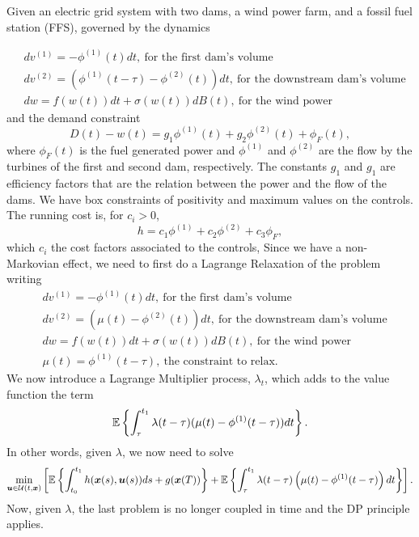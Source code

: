 \begin{example} \label{ex:quadr_prob}

Given an electric grid system with two dams, a wind power farm, and a fossil fuel 
station (FFS), governed by the dynamics

\begin{equation} \label{eq:dyn_coupled_dams}
\begin{aligned}
&dv^{(1)} = -\phi^{(1)}(t) dt,\ \text{for the first dam's volume} \\
&dv^{(2)}=(\phi^{(1)}(t-\tau)-\phi^{(2)}(t)) dt,\ \text{for the downstream dam's volume} \\
&dw =f(w(t)) dt + \sigma(w(t)) dB(t),\ \text{for the wind power}
\end{aligned}
\end{equation}
and the demand constraint
\[
D(t) -w(t) = g_1\phi^{(1)}(t) + g_2\phi^{(2)}(t) + \phi_F(t),
\]
where $\phi_F(t)$ is the fuel generated power and $\phi^{(1)}$ and $\phi^{(2)}$ are the flow by the turbines of the first and second dam, respectively. The constants $g_1$ and $g_1$ are efficiency factors that are the relation between the power and the flow of the dams. We have box constraints of positivity and maximum values on the controls.
The running cost is, for $c_i>0$,
\[
h = c_1 \phi^{(1)} + c_2 \phi^{(2)} + c_3 \phi_F,
\]
which $c_i$ the cost factors associated to the controls, Since we have a non-Markovian effect, we need to first do a Lagrange Relaxation
 of the problem writing
\begin{equation}
\begin{aligned}
&dv^{(1)} = -\phi^{(1)}(t) dt,\ \text{for the first dam's volume} \\
&dv^{(2)} = (\mu(t)-\phi^{(2)}(t)) dt,\ \text{for  the downstream dam's volume} \\
&dw =f(w(t)) dt + \sigma(w(t)) dB(t),\ \text{for the wind power}\\
&\mu(t) =\phi^{(1)}(t-\tau),\ \text{the constraint to relax}.
\end{aligned}
\end{equation}
We now introduce a Lagrange Multiplier process, $\lambda_t$, which adds 
to the value function the term
\[
\mathbb{E}\left\{\int_\tau^{t_1} \lambda(t-\tau) (\mu(t) -\phi^{(1)}(t-\tau)) dt\right\}.
\]
In other words,  given $\lambda$, we now need to solve
\[
\min_{\bm{u} \in \mathcal{U}(t,\bm{x})}\left[ \mathbb{E}\left\{\int_{t_0}^{t_1} h(\bm{x}(s),\bm{u}(s) ) ds + g(\bm{x}(T))\right\} + \mathbb{E}\left\{\int_\tau^{t_1} \lambda(t-\tau) \left(\mu(t) -\phi^{(1)}(t-\tau)\right) dt\right\}\right].
\]
Now, given $\lambda$, the last problem is no longer coupled in time and the DP 
principle applies.
\end{example}

